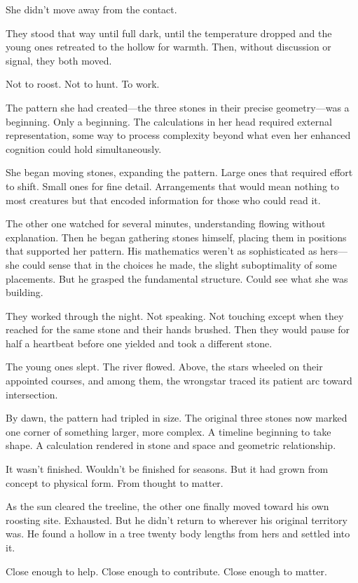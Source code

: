 She didn't move away from the contact.

They stood that way until full dark, until the temperature dropped and the young ones retreated to the hollow for warmth. Then, without discussion or signal, they both moved.

Not to roost. Not to hunt. To work.

The pattern she had created—the three stones in their precise geometry—was a beginning. Only a beginning. The calculations in her head required external representation, some way to process complexity beyond what even her enhanced cognition could hold simultaneously.

She began moving stones, expanding the pattern. Large ones that required effort to shift. Small ones for fine detail. Arrangements that would mean nothing to most creatures but that encoded information for those who could read it.

The other one watched for several minutes, understanding flowing without explanation. Then he began gathering stones himself, placing them in positions that supported her pattern. His mathematics weren't as sophisticated as hers—she could sense that in the choices he made, the slight suboptimality of some placements. But he grasped the fundamental structure. Could see what she was building.

They worked through the night. Not speaking. Not touching except when they reached for the same stone and their hands brushed. Then they would pause for half a heartbeat before one yielded and took a different stone.

The young ones slept. The river flowed. Above, the stars wheeled on their appointed courses, and among them, the wrongstar traced its patient arc toward intersection.

By dawn, the pattern had tripled in size. The original three stones now marked one corner of something larger, more complex. A timeline beginning to take shape. A calculation rendered in stone and space and geometric relationship.

It wasn't finished. Wouldn't be finished for seasons. But it had grown from concept to physical form. From thought to matter.

As the sun cleared the treeline, the other one finally moved toward his own roosting site. Exhausted. But he didn't return to wherever his original territory was. He found a hollow in a tree twenty body lengths from hers and settled into it.

Close enough to help. Close enough to contribute. Close enough to matter.


